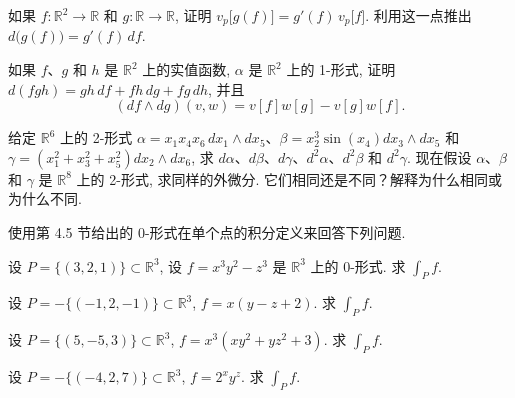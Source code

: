 \begin{question}\label{q:4-32}
如果 $f:\mathbb{R}^2\to\mathbb{R}$ 和 $g:\mathbb{R}\to\mathbb{R}$, 证明 $v_p\bigl[g(f)\bigr]=g'(f)\,v_p\bigl[f\bigr]$. 利用这一点推出 $d\bigl(g(f)\bigr)=g'(f)\,df$.
\end{question}

\begin{question}\label{q:4-33}
如果 $f$、$g$ 和 $h$ 是 $\mathbb{R}^2$ 上的实值函数, $\alpha$ 是 $\mathbb{R}^2$ 上的 1-形式, 证明 $d(fgh)=gh\,df+fh\,dg+fg\,dh$, 并且
\[
(df\wedge dg)(v,w)=v[f]w[g]-v[g]w[f].
\]
\end{question}

\begin{question}\label{q:4-34}
给定 $\mathbb{R}^6$ 上的 2-形式 $\alpha=x_1x_4x_6\,dx_1\wedge dx_5$、$\beta=x_2^3\sin(x_4)dx_3\wedge dx_5$ 和 $\gamma=(x_1^2+x_3^2+x_5^2)dx_2\wedge dx_6$, 求 $d\alpha$、$d\beta$、$d\gamma$、$d^2\alpha$、$d^2\beta$ 和 $d^2\gamma$. 现在假设 $\alpha$、$\beta$ 和 $\gamma$ 是 $\mathbb{R}^8$ 上的 2-形式, 求同样的外微分. 它们相同还是不同？解释为什么相同或为什么不同.
\end{question}

使用第 4.5 节给出的 0-形式在单个点的积分定义来回答下列问题.

\begin{question}\label{q:4-35}
设 $P=\{(3,2,1)\}\subset\mathbb{R}^3$, 设 $f=x^3y^2-z^3$ 是 $\mathbb{R}^3$ 上的 0-形式. 求 $\int_P f$.
\end{question}

\begin{question}\label{q:4-36}
设 $P=-\{(-1,2,-1)\}\subset\mathbb{R}^3$, $f=x(y-z+2)$. 求 $\int_P f$.
\end{question}

\begin{question}\label{q:4-37}
设 $P=\{(5,-5,3)\}\subset\mathbb{R}^3$, $f=x^3(xy^2+yz^2+3)$. 求 $\int_P f$.
\end{question}

\begin{question}\label{q:4-38}
设 $P=-\{(-4,2,7)\}\subset\mathbb{R}^3$, $f=2^xy^z$. 求 $\int_P f$.
\end{question}
